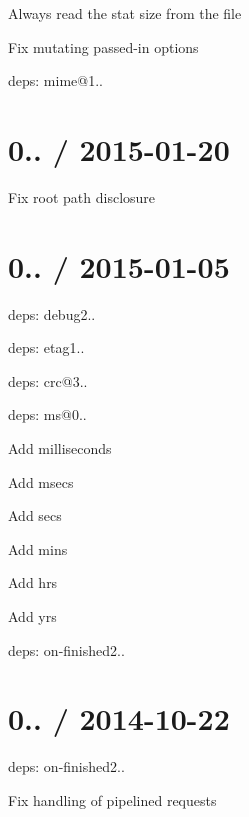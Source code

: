 \begin{DoxyItemize}
\item Always read the stat size from the file
\item Fix mutating passed-\/in {\ttfamily options}
\item deps\+: mime@1..
\end{DoxyItemize}

\section*{0.. / 2015-\/01-\/20 }


\begin{DoxyItemize}
\item Fix {\ttfamily root} path disclosure
\end{DoxyItemize}

\section*{0.. / 2015-\/01-\/05 }


\begin{DoxyItemize}
\item deps\+: debug2..
\item deps\+: etag1..
\begin{DoxyItemize}
\item deps\+: crc@3..
\end{DoxyItemize}
\item deps\+: ms@0..
\begin{DoxyItemize}
\item Add {\ttfamily milliseconds}
\item Add {\ttfamily msecs}
\item Add {\ttfamily secs}
\item Add {\ttfamily mins}
\item Add {\ttfamily hrs}
\item Add {\ttfamily yrs}
\end{DoxyItemize}
\item deps\+: on-\/finished2..
\end{DoxyItemize}

\section*{0.. / 2014-\/10-\/22 }


\begin{DoxyItemize}
\item deps\+: on-\/finished2..
\begin{DoxyItemize}
\item Fix handling of pipelined requests
\end{DoxyItemize}
\end{DoxyItemize}

